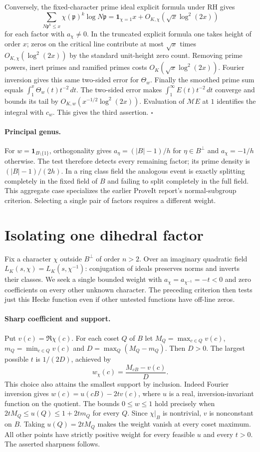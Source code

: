 Conversely, the fixed-character prime ideal explicit formula under RH gives
\[\sum_{N\mathfrak p^k\le x}\chi(\mathfrak p)^k\log N\mathfrak p
=\mathbf1_{\chi=1}x+O_{K,\chi}(\sqrt{x}\log^2(2x))\] for each factor
with $a_\chi\ne0$. In the truncated explicit formula one takes height of
order $x$; zeros on the critical line contribute at most $\sqrt{x}$ times
$O_{K,\chi}(\log^2(2x))$ by the standard unit-height zero count.
Removing prime powers, inert primes and ramified primes costs
$O_K(\sqrt{x}\log^2(2x))$. Fourier inversion gives this same two-sided
error for $\Theta_w$. Finally the smoothed prime sum equals
$\int_1^x\Theta_w(t)t^{-2}\,dt$. The two-sided error makes
$\int_1^\infty E(t)t^{-2}\,dt$ converge and bounds its tail by
$O_{K,w}(x^{-1/2}\log^2(2x))$. Evaluation of $\mathcal ME$ at $1$
identifies the integral with $c_w$. This gives the third assertion.
\hfill$\square$

\paragraph{Principal genus.}
For $w=\mathbf1_{B\setminus\{1\}}$, orthogonality gives
$a_\eta=(|B|-1)/h$ for $\eta\in B^\perp$ and $a_\chi=-1/h$ otherwise.
The test therefore detects every remaining factor; its prime density is
$(|B|-1)/(2h)$. In a ring class field the analogous event is exactly
splitting completely in the fixed field of $B$ and failing to split
completely in the full field. This aggregate case specializes the earlier
ProveIt report's normal-subgroup criterion. Selecting a single pair of
factors requires a different weight.

\section{Isolating one dihedral factor}
Fix a character $\chi$ outside $B^\perp$ of order $n>2$.
Over an imaginary quadratic field $L_K(s,\chi)=L_K(s,\chi^{-1})$:
conjugation of ideals preserves norms and inverts their classes.
We seek a single bounded weight with $a_\chi=a_{\chi^{-1}}=-t<0$
and zero coefficients on every other unknown character. The preceding
criterion then tests just this Hecke function even if other untested
functions have off-line zeros.

\paragraph{Sharp coefficient and support.}
Put $v(c)=\Re\chi(c)$. For each coset $Q$ of $B$ let
$M_Q=\max_{c\in Q} v(c)$, $m_Q=\min_{c\in Q}v(c)$ and
$D=\max_Q(M_Q-m_Q)$. Then $D>0$. The largest possible $t$ is
$1/(2D)$, achieved by
\[
 w_\chi(c)=\frac{M_{cB}-v(c)}D .
\]
This choice also attains the smallest support by inclusion.
Indeed Fourier inversion gives $w(c)=u(cB)-2t v(c)$, where $u$ is a real,
inversion-invariant function on the quotient. The bounds $0\le w\le1$
hold precisely when $2tM_Q\le u(Q)\le1+2t m_Q$ for every $Q$.
Since $\chi|_B$ is nontrivial, $v$ is nonconstant on $B$. Taking
$u(Q)=2tM_Q$ makes the weight vanish at every coset maximum. All other
points have strictly positive weight for every feasible $u$ and every
$t>0$. The asserted sharpness follows.

